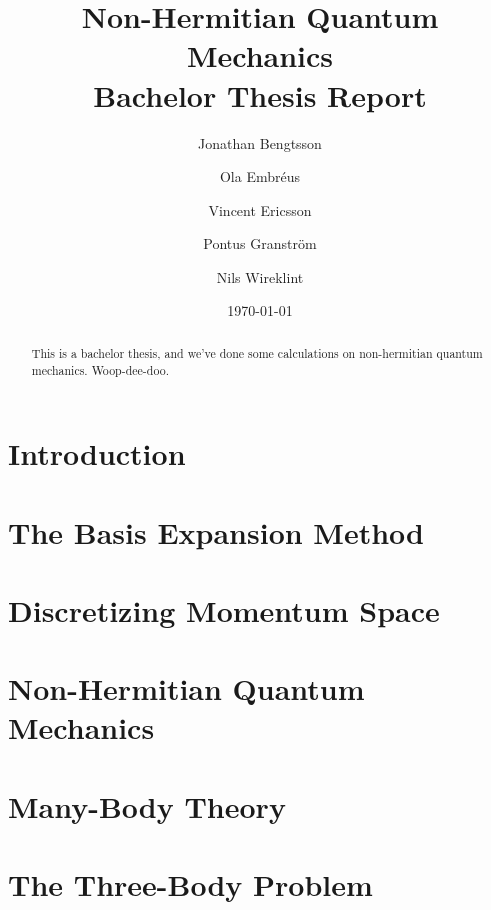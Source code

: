\documentclass[12pt,a4paper]{report}
\begin{document}
  


\title{Non-Hermitian Quantum Mechanics\\
\Large Bachelor Thesis Report}
\author{Jonathan Bengtsson  \and Ola Embréus \and Vincent Ericsson \and Pontus Granström \and Nils Wireklint}
\date{\today}



\maketitle

\newpage
\begin{abstract}
This is a bachelor thesis, and we've done some calculations on non-hermitian quantum mechanics. Woop-dee-doo.
\end{abstract}
\newpage

\tableofcontents

\newpage

\chapter{Introduction}
\label{cha:introduction}



\chapter{The Basis Expansion Method}
\label{cha:basis_expansion}



\chapter{Discretizing Momentum Space}
\label{cha:mom_space}


\chapter{Non-Hermitian Quantum Mechanics} 
\label{cha:nhqm}


\chapter{Many-Body Theory}
\label{cha:many_body}




\chapter{The Three-Body Problem}
\label{cha:three_body}
\end{document}
